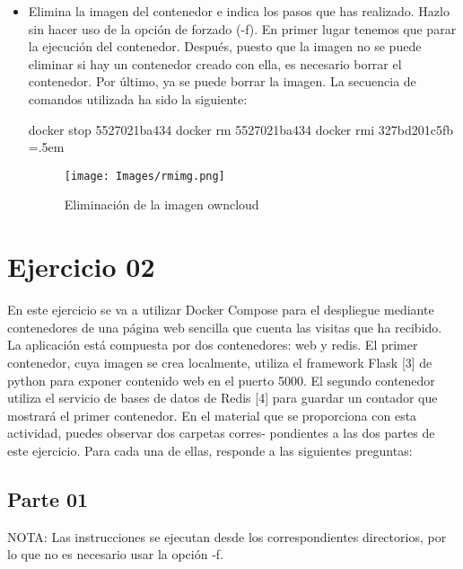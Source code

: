 \documentclass[12pt,a4paper]{article}
\newenvironment{lcverbatim}
 {\SaveVerbatim{cverb}}
 {\endSaveVerbatim
  \flushleft\fboxrule=0pt\fboxsep=.5em
  \colorbox{cverbbg}{%
    \makebox[\dimexpr\linewidth-2\fboxsep][l]{\BUseVerbatim{cverb}}%
  }
  \endflushleft
}
\begin{document}
\begin{itemize}
\item Elimina la imagen del contenedor e indica los pasos que has realizado. Hazlo sin hacer uso
de la opción de forzado (-f). En primer lugar tenemos que parar la ejecución del contenedor. Después, puesto que la imagen no se puede eliminar si hay un contenedor creado con ella, es necesario borrar el contenedor. Por último, ya se puede borrar la imagen. La secuencia de comandos utilizada ha sido la siguiente:

\begin{lcverbatim}
docker stop 5527021ba434
docker rm 5527021ba434
docker rmi 327bd201c5fb
\end{lcverbatim}

\begin{figure}[h]
    \centering
    \texttt{[image: Images/rmimg.png]}
    \caption{Eliminación de la imagen owncloud}
    \label{fig:rmimg}
\end{figure}

\end{itemize}

%
%
%
%
%
%
%

\section{Ejercicio 02}
En este ejercicio se va a utilizar Docker Compose para el despliegue mediante contenedores
de una página web sencilla que cuenta las visitas que ha recibido. La aplicación está compuesta
por dos contenedores: web y redis. El primer contenedor, cuya imagen se crea localmente, utiliza
el framework Flask [3] de python para exponer contenido web en el puerto 5000. El segundo
contenedor utiliza el servicio de bases de datos de Redis [4] para guardar un contador que mostrará
el primer contenedor.
En el material que se proporciona con esta actividad, puedes observar dos carpetas corres-
pondientes a las dos partes de este ejercicio. Para cada una de ellas, responde a las siguientes
preguntas:

\subsection{Parte 01}
NOTA: Las instrucciones se ejecutan desde los correspondientes directorios, por lo que no es necesario usar la opción -f.
\end{document}

